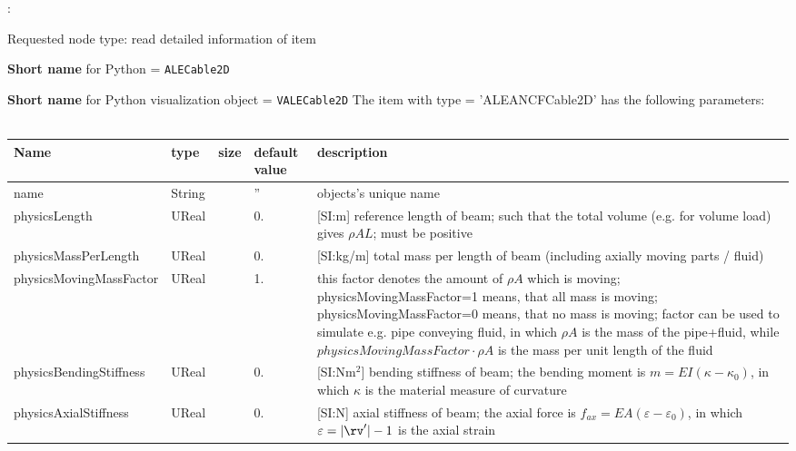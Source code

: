 \noindent {}:
\bi
  \item Requested node type: read detailed information of item
  \item {\bf Short name} for Python = \texttt{ALECable2D}
  \item {\bf Short name} for Python visualization object = \texttt{VALECable2D}
\ei\vspace{12pt} \noindent 
The item  with type = 'ALEANCFCable2D' has the following parameters:
\vspace{-0.5cm}\\
\vspace{-0.5cm}\\
\begin{center}
  \footnotesize
  \begin{longtable}{| p{4.5cm} | p{2.5cm} | p{0.5cm} | p{2.5cm} | p{6cm} |}
    \hline
    \bf Name & \bf type & \bf size & \bf default value & \bf description \\ \hline
    name &     String &      &     '' &     objects's unique name\\ \hline
    physicsLength &     UReal &      &     0. &      [SI:m] reference length of beam; such that the total volume (e.g. for volume load) gives $\rho A L$; must be positive\\ \hline
    physicsMassPerLength &     UReal &      &     0. &      [SI:kg/m] total mass per length of beam (including axially moving parts / fluid)\\ \hline
    physicsMovingMassFactor &     UReal &      &     1. &     this factor denotes the amount of $\rho A$ which is moving; physicsMovingMassFactor=1 means, that all mass is moving; physicsMovingMassFactor=0 means, that no mass is moving; factor can be used to simulate e.g. pipe conveying fluid, in which $\rho A$ is the mass of the pipe+fluid, while $physicsMovingMassFactor \cdot \rho A$ is the mass per unit length of the fluid\\ \hline
    physicsBendingStiffness &     UReal &      &     0. &      [SI:Nm$^2$] bending stiffness of beam; the bending moment is $m = EI (\kappa - \kappa_0)$, in which $\kappa$ is the material measure of curvature\\ \hline
    physicsAxialStiffness &     UReal &      &     0. &      [SI:N] axial stiffness of beam; the axial force is $f_{ax} = EA (\varepsilon -\varepsilon_0)$, in which $\varepsilon = |\rv^\prime|-1$ is the axial strain\\ \hline

\end{longtable}
\end{center}
